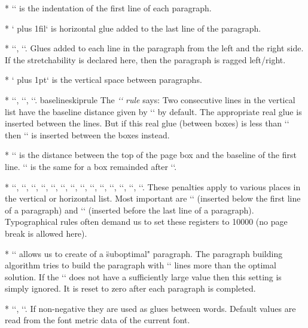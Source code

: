 {* \y`\parindent=20pt` is the indentation of the first line of each paragraph.

* \y`\parfillskip=0pt plus 1fil` is horizontal glue added to the last line of the
  paragraph.

* \y`\leftskip=0pt`, \y`\rightskip=0pt`. Glues added to each line in the
  paragraph from the left and the right side. If the stretchability is declared here,
  then the paragraph is ragged left/right.

* \y`\parskip=0pt plus 1pt` is the vertical space between paragraphs.

* \y`\baselineskip=12pt`,
  \y`\lineskiplimit=0pt`,
  \y`\lineskip=1pt`.
  \ii baselineskiprule The {\em `\baselineskip` rule} says: 
  Two consecutive lines in the vertical list have the baseline distance given 
  by \x`\baselineskip` by default. The appropriate real glue is inserted
  between the lines.
  But if this real glue (between boxes) is less than \x`\lineskiplimit` 
  then \x`\lineskip` is inserted between the boxes instead.

* \y`\topskip=10pt` is the distance between the top of the page box and the baseline of
  the first line.
  \y`\splittopskip=10pt` is the same for a box remainded after \q`\vsplit`.

* \y``,
  \y``,
  \y``,
  \y``,
  \y``,
  \y``,
  \y``,
  \y``,
  \y``,
  \y``,
  \y``,
  \y``,
  \y``,
  \y``.
  These penalties apply to various places in the vertical or horizontal
  list. Most important are \x`\clubpenalty` (inserted below the first line of a paragraph)
  and \x`\widowpenalty` (inserted before the last line of a paragraph). Typographical rules
  often demand us to set these registers to 10000 (no page break is allowed here).

* \y`` allows us to create of a \"suboptimal" paragraph. The
  paragraph building
  algorithm tries to build the paragraph with \x`\looseness` lines more than
  the optimal solution. If the {\noda\x`\tolerance`} does not have a sufficiently large value
  then this setting is simply ignored. It is reset to zero after each
  paragraph is completed.

* \y`\spaceskip=0pt`,
  \y`\xspaceskip=0pt`. If non-negative they are used as glues between words.
  Default values are read from the font metric data of the current font.

}
